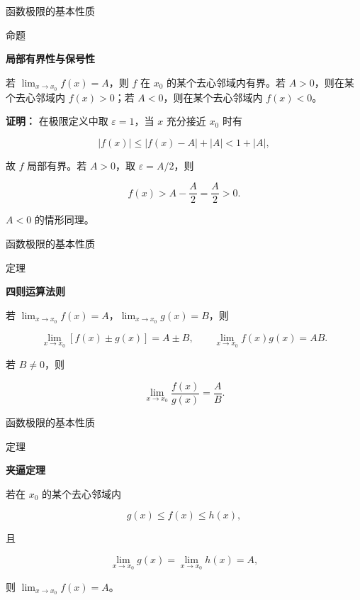 \documentclass[aspectratio=169,10pt,fontset=fandol]{ctexbeamer}
\begin{document}
\begin{frame}[t,fragile]{函数极限的基本性质}
\normalsize
\begin{block}{命题}
{\normalsize
\textbf{局部有界性与保号性}\par


若 \(\lim_{x\to x_0}f(x)=A\)，则 \(f\) 在 \(x_0\) 的某个去心邻域内有界。若 \(A>0\)，则在某个去心邻域内 \(f(x)>0\)；若 \(A<0\)，则在某个去心邻域内 \(f(x)<0\)。


}
\end{block}
\pause
{\normalsize
\textbf{证明：}
在极限定义中取 \(\varepsilon=1\)，当 \(x\) 充分接近 \(x_0\) 时有

\[

|f(x)|\leq |f(x)-A|+|A|<1+|A|,

\]

故 \(f\) 局部有界。若 \(A>0\)，取 \(\varepsilon=A/2\)，则

\[

f(x)>A-\frac A2=\frac A2>0.

\]

\(A<0\) 的情形同理。


}
\end{frame}
\begin{frame}[t,fragile]{函数极限的基本性质}
\normalsize
\begin{block}{定理}
{\normalsize
\textbf{四则运算法则}\par


若 \(\lim_{x\to x_0}f(x)=A\)，\(\lim_{x\to x_0}g(x)=B\)，则

\[

\lim_{x\to x_0}[f(x)\pm g(x)]=A\pm B,\qquad

\lim_{x\to x_0}f(x)g(x)=AB.

\]

若 \(B\neq0\)，则

\[

\lim_{x\to x_0}\frac{f(x)}{g(x)}=\frac AB.

\]


}
\end{block}
\end{frame}
\begin{frame}[t,fragile]{函数极限的基本性质}
\normalsize
\begin{block}{定理}
{\normalsize
\textbf{夹逼定理}\par


若在 \(x_0\) 的某个去心邻域内

\[

g(x)\leq f(x)\leq h(x),

\]

且

\[

\lim_{x\to x_0}g(x)=\lim_{x\to x_0}h(x)=A,

\]

则 \(\lim_{x\to x_0}f(x)=A\)。


}
\end{block}
\end{frame}
\end{document}
